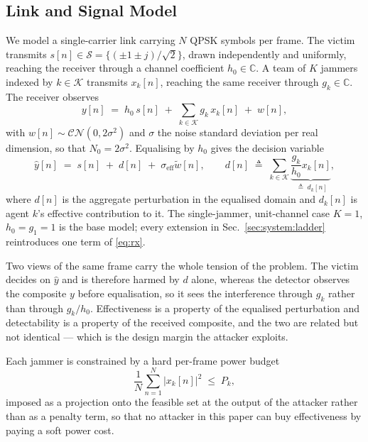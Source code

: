 \subsection{Link and Signal Model}
\label{sec:system:link}

We model a single-carrier link carrying $N$ QPSK symbols per frame.
The victim transmits $s[n] \in \mathcal{S} = \{(\pm 1 \pm j)/\sqrt{2}\}$, drawn independently and uniformly, reaching the receiver through a channel coefficient $h_0 \in \mathbb{C}$.
A team of $K$ jammers indexed by $k \in \mathcal{K}$ transmits $x_k[n]$, reaching the same receiver through $g_k \in \mathbb{C}$.
The receiver observes
\begin{equation}
  y[n] \;=\; h_0\, s[n] \;+\; \sum_{k \in \mathcal{K}} g_k\, x_k[n] \;+\; w[n],
  \label{eq:rx}
\end{equation}
with $w[n] \sim \mathcal{CN}(0, 2\sigma^2)$ and $\sigma$ the noise standard deviation per real dimension, so that $N_0 = 2\sigma^2$.
Equalising by $h_0$ gives the decision variable
\begin{equation}
  \hat{y}[n] \;=\; s[n] \;+\; d[n] \;+\; \sigma_{\mathrm{eff}} \tilde{w}[n],
  \qquad
  d[n] \;\triangleq\; \sum_{k \in \mathcal{K}} \underbrace{\frac{g_k}{h_0} x_k[n]}_{\;\triangleq\; d_k[n]},
  \label{eq:eq}
\end{equation}
where $d[n]$ is the aggregate perturbation in the equalised domain and $d_k[n]$ is agent $k$'s effective contribution to it.
The single-jammer, unit-channel case $K=1$, $h_0 = g_1 = 1$ is the base model; every extension in Sec.~\ref{sec:system:ladder} reintroduces one term of \eqref{eq:rx}.

Two views of the same frame carry the whole tension of the problem.
The victim decides on $\hat{y}$ and is therefore harmed by $d$ alone, whereas the detector observes the composite $y$ before equalisation, so it sees the interference through $g_k$ rather than through $g_k / h_0$.
Effectiveness is a property of the equalised perturbation and detectability is a property of the received composite, and the two are related but not identical --- which is the design margin the attacker exploits.

Each jammer is constrained by a hard per-frame power budget
\begin{equation}
  \frac{1}{N} \sum_{n=1}^{N} \bigl| x_k[n] \bigr|^2 \;\le\; P_k ,
  \label{eq:power}
\end{equation}
imposed as a projection onto the feasible set at the output of the attacker rather than as a penalty term, so that no attacker in this paper can buy effectiveness by paying a soft power cost.

